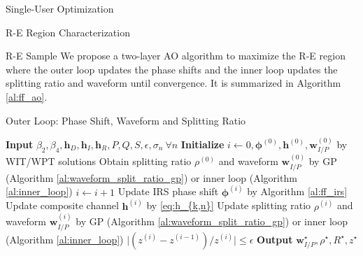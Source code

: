 \documentclass{IEEEtran}
\begin{document}
\begin{section}{Single-User Optimization}
\begin{subsection}{R-E Region Characterization}
		\begin{subsubsection}{R-E Sample}
			We propose a two-layer AO algorithm to maximize the R-E region where the outer loop updates the phase shifts and the inner loop updates the splitting ratio and waveform until convergence. It is summarized in Algorithm \ref{al:ff_ao}.
			\begin{algorithm}
				\caption{Outer Loop: Phase Shift, Waveform and Splitting Ratio}
				\label{al:ff_ao}
				\begin{algorithmic}[1]
					\State \textbf{Input} $\beta_2,\beta_4,\boldsymbol{h}_D, \boldsymbol{h}_I, \boldsymbol{h}_R, P, Q, S, \epsilon, \sigma_n \ \forall n$
					\State \textbf{Initialize} $i \gets 0, \boldsymbol{\phi}^{(0)}, \boldsymbol{h}^{(0)}, \boldsymbol{w}_{I/P}^{(0)}$ by WIT/WPT solutions
					\State Obtain splitting ratio $\rho^{(0)}$ and waveform $\boldsymbol{w}_{I/P}^{(0)}$ by GP (Algorithm \ref{al:waveform_split_ratio_gp}) or inner loop (Algorithm \ref{al:inner_loop})
					\Repeat
					\State $i \gets i + 1$
					\State Update IRS phase shift $\boldsymbol{\phi}^{(i)}$ by Algorithm \ref{al:ff_irs}
					\State Update composite channel $\boldsymbol{h}^{(i)}$ by \ref{eq:h_{k,n}}
					\State Update splitting ratio $\rho^{(i)}$ and waveform $\boldsymbol{w}_{I/P}^{(i)}$ by GP (Algorithm \ref{al:waveform_split_ratio_gp}) or inner loop (Algorithm \ref{al:inner_loop})
					\Until $\lvert (z^{(i)}-z^{(i-1)}) / z^{(i)} \rvert \le \epsilon$
					\State \textbf{Output} $\boldsymbol{w}_{I/P}^{\star}, \rho^{\star}, R^{\star}, z^{\star}$
				\end{algorithmic}
			\end{algorithm}
		\end{subsubsection}
	\end{subsection}
\end{section}



\end{document}
